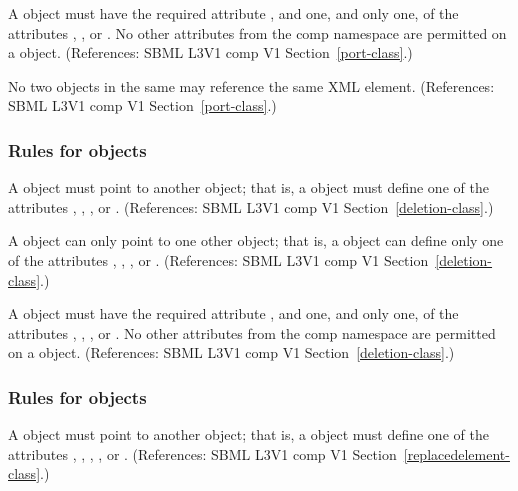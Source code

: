 \begin{sbmlenum}
 { A \Port object must have the
  required attribute , and one, and only one, of the attributes  
  , , or .
  No other attributes from the comp namespace are permitted on a
  \Port object.
  (References: SBML L3V1 comp V1 Section~\ref{port-class}.) }


 { No two \Port objects in the same \Model may
  reference the same XML element.
  (References: SBML L3V1 comp V1 Section~\ref{port-class}.) }

\end{sbmlenum} \subsubsection*{Rules for  objects} \begin{sbmlenum}

 { A \Deletion object must point to another object; that is,
  a \Deletion object must define one of the attributes , 
  , , or . 
  (References: SBML L3V1 comp V1 Section~\ref{deletion-class}.) }


 { A \Deletion object can only point to one other object; that is,
  a \Deletion object can define only one of the attributes  , 
  , , or .
  (References: SBML L3V1 comp V1 Section~\ref{deletion-class}.) }


 { A \Deletion object must have the
  required attribute , and one, and only one, of the attributes
  , 
  , , or .
  No other attributes from the comp namespace are permitted on a
  \Deletion object.
  (References: SBML L3V1 comp V1 Section~\ref{deletion-class}.) }

\end{sbmlenum} \subsubsection*{Rules for  objects} \begin{sbmlenum}

 { A \ReplacedElement object must point to another object; that is,
  a \ReplacedElement object must define one of the attributes , 
  , , , or . 
  (References: SBML L3V1 comp V1 Section~\ref{replacedelement-class}.) }



\end{sbmlenum}
